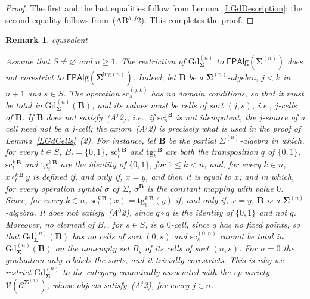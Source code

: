 \documentclass[a4paper, reqno]{amsbook}
\makeatletter
\newcommand{\sig}[1]{\mathbf{#1}}             %
\newcommand{\spec}[1]{\boldsymbol{\mathcal{#1}}} %
\newcommand{\htg}{\mathrm{htg}}                %
\newcommand{\src}{\mathrm{sc}}
\newcommand{\tgt}{\mathrm{tg}}
\newcommand{\Gd}{\mathrm{Gd}}
\theoremstyle{plain}
\newtheorem{remark}[theorem]{Remark}
\theoremstyle{definition}
\newcommand*{\CA@leanpending}{}
\newcommand*{\CA@leanrelation}{}
\newcommand*{\lean}[2]{%
  \ifcsname\string\color@lean@#1\endcsname\else
    \PackageError{main}{Unknown relation `#1' in \string\lean}{Use equivalent, weaker or stronger.}%
  \fi
  \gdef\CA@leanrelation{#1}%
  \gdef\CA@leanpending{#2}}
\makeatother
\begin{document}
\begin{proof}
The first and the last equalities follow from Lemma~\ref{LGdDescription}; the second equality follows from~(AB$^{h,j}$2). This completes the proof.
\end{proof}

\begin{remark}\label{RGdNotEpAlg}\lean{equivalent}{Presentations.GraduationCounterexample.graduation_not_isEPAlgebra}
Assume that $S\neq\varnothing$ and $n\geq 1$.
The restriction of $\Gd^{(n)}_{\sig{\Sigma}}$ to $\mathsf{EPAlg}(\sig{\Sigma}^{(n)})$ does not corestrict to $\mathsf{EPAlg}(\sig{\Sigma}^{\htg(n)})$.
Indeed, let $\mathbf{B}$ be a $\sig{\Sigma}^{(n)}$-algebra, $j<k$ in $n+1$ and $s\in S$.
The operation $\src^{(j,k)}_{s}$ has no domain conditions, so that it must be total in $\Gd^{(n)}_{\sig{\Sigma}}(\mathbf{B})$, and its values must be cells of sort $(j,s)$, i.e., $j$-cells of $\mathbf{B}$.
If $\mathbf{B}$ does not satisfy~(A$^{j}$2), i.e., if $\src^{j\,\mathbf{B}}_{s}$ is not idempotent, the $j$-source of a cell need not be a $j$-cell; the axiom~(A$^{j}$2) is precisely what is used in the proof of Lemma~\ref{LGdCells}~(2).
For instance, let $\mathbf{B}$ be the partial $\Sigma^{(n)}$-algebra in which, for every $t\in S$, $B_{t}=\{0,1\}$, $\src^{0\,\mathbf{B}}_{t}$ and $\tgt^{0\,\mathbf{B}}_{t}$ are both the transposition $q$ of $\{0,1\}$, $\src^{k\,\mathbf{B}}_{t}$ and $\tgt^{k\,\mathbf{B}}_{t}$ are the identity of $\{0,1\}$, for $1\leq k<n$, and, for every $k\in n$, $x\circ^{k\,\mathbf{B}}_{t}y$ is defined if, and only if, $x=y$, and then it is equal to $x$; and in which, for every operation symbol $\sigma$ of $\Sigma$, $\sigma^{\mathbf{B}}$ is the constant mapping with value $0$.
Since, for every $k\in n$, $\src^{k\,\mathbf{B}}_{t}(x)=\tgt^{k\,\mathbf{B}}_{t}(y)$ if, and only if, $x=y$, $\mathbf{B}$ is a $\sig{\Sigma}^{(n)}$-algebra.
It does not satisfy~(A$^{0}$2), since $q\circ q$ is the identity of $\{0,1\}$ and not $q$.
Moreover, no element of $B_{s}$, for $s\in S$, is a $0$-cell, since $q$ has no fixed points, so that $\Gd^{(n)}_{\sig{\Sigma}}(\mathbf{B})$ has no cells of sort $(0,s)$ and $\src^{(0,n)}_{s}$ cannot be total in $\Gd^{(n)}_{\sig{\Sigma}}(\mathbf{B})$ on the nonempty set $B_{s}$ of its cells of sort $(n,s)$.
For $n=0$ the graduation only relabels the sorts, and it trivially corestricts.
This is why we restrict $\Gd^{(n)}_{\sig{\Sigma}}$ to the category canonically associated with the ep-variety $\mathcal{V}(\spec{C}^{\sig{\Sigma}^{(n)}})$, whose objects satisfy~(A$^{j}$2), for every $j\in n$.
\end{remark}
\end{document}
